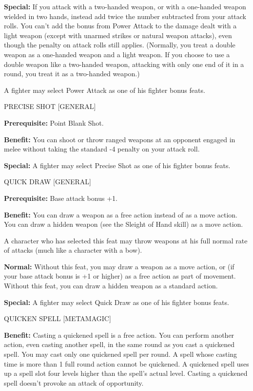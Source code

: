 \documentclass{article}
\begin{document}
\textbf{Special:} If you attack with a two-handed weapon, or with a one-handed 
weapon wielded in two hands, instead add twice the number subtracted from your 
attack rolls. You can't add the bonus from Power Attack to the damage dealt with 
a light weapon (except with unarmed strikes or natural weapon attacks), even though 
the penalty on attack rolls still applies. (Normally, you treat a double weapon 
as a one-handed weapon and a light weapon. If you choose to use a double weapon 
like a two-handed weapon, attacking with only one end of it in a round, you treat 
it as a two-handed weapon.)

A fighter may select Power Attack as one of his fighter bonus feats.

\vspace{12pt}
PRECISE SHOT [GENERAL]

\textbf{Prerequisite:} Point Blank Shot.

\textbf{Benefit:} You can shoot or throw ranged weapons at an opponent engaged 
in melee without taking the standard -4 penalty on your attack roll.

\textbf{Special:} A fighter may select Precise Shot as one of his fighter bonus 
feats.

\vspace{12pt}
QUICK DRAW [GENERAL]

\textbf{Prerequisite:} Base attack bonus +1.

\textbf{Benefit:} You can draw a weapon as a free action instead of as a move action. 
You can draw a hidden weapon (see the Sleight of Hand skill) as a move action.

A character who has selected this feat may throw weapons at his full normal rate 
of attacks (much like a character with a bow).

\textbf{Normal: }Without this feat, you may draw a weapon as a move action, or 
(if your base attack bonus is +1 or higher) as a free action as part of movement. 
Without this feat, you can draw a hidden weapon as a standard action.

\textbf{Special:} A fighter may select Quick Draw as one of his fighter bonus feats.

\vspace{12pt}
QUICKEN SPELL [METAMAGIC]

\textbf{Benefit:} Casting a quickened spell is a free action. You can perform another 
action, even casting another spell, in the same round as you cast a quickened spell. 
You may cast only one quickened spell per round. A spell whose casting time is 
more than 1 full round action cannot be quickened. A quickened spell uses up a 
spell slot four levels higher than the spell's actual level. Casting a quickened 
spell doesn't provoke an attack of opportunity.
\end{document}
